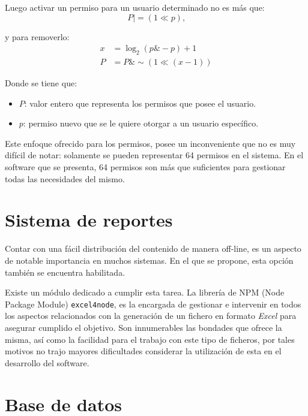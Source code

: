 \noindent Luego activar un permiso para un usuario determinado no es más que: \\
\begin{equation}
	P \mid= (1 \ll p) \text{,}
\end{equation}

\noindent y para removerlo:\\
\begin{equation}
	\begin{split}	
		x & = \log_{2}(p \& -p) + 1  \\
		P & = P \& \sim(1 \ll (x - 1))
	\end{split}
\end{equation}

\noindent Donde se tiene que: \\
\begin{itemize}
	\item $P$: valor entero que representa los permisos que posee el usuario.
	\item $p$: permiso nuevo que se le quiere otorgar a un usuario específico.
\end{itemize}

Este enfoque ofrecido para los permisos, posee un inconveniente que no es muy difícil de notar: solamente se pueden representar 64 permisos en el sistema. En el software que se presenta, 64 permisos son más que suficientes para  gestionar todas las necesidades del mismo.

\section{Sistema de reportes}

Contar con una fácil distribución del contenido de manera off-line, es un aspecto de notable importancia en muchos sistemas. En el que se propone, esta opción también se encuentra habilitada. 

Existe un módulo dedicado a cumplir esta tarea. La librería de NPM (Node Package Module) \texttt{excel4node}, es la encargada de gestionar e intervenir en todos los aspectos relacionados con la generación de un fichero en formato \textit{Excel} para asegurar cumplido el objetivo. Son innumerables las bondades que ofrece la misma, así como la facilidad para el trabajo con este tipo de ficheros, por tales motivos no trajo mayores dificultades considerar la utilización de esta en el desarrollo del software.\cite{excel4node_npm}

\section{Base de datos}

